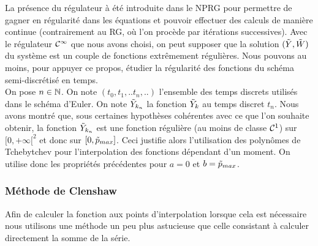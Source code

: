 \documentclass[10.5pt]{article}
\begin{document}
\begin{multicols*}{2}
{
}


La présence du régulateur à été introduite dans le NPRG pour permettre de gagner en régularité dans les équations et pouvoir effectuer des calculs de manière continue (contrairement au RG, où l'on procède par itérations successives). Avec le régulateur $\mathcal{C}^\infty$ que nous avons choisi, on peut supposer que la solution $(\tilde{Y}, \tilde{W})$ du système est un couple de fonctions extrêmement régulières. Nous pouvons au moins, pour appuyer ce propos, étudier la régularité des fonctions du schéma semi-discrétisé en temps. \\
\indent
On pose $n \in \mathbb{N}$. On note $(t_0, t_1, .. t_n, ..)$ l'ensemble des temps discrets utilisés dans le schéma d'Euler. On note $\tilde{Y}_{k_n}$ la fonction $\tilde{Y}_k$ au temps discret $t_n$. Nous avons montré que, sous certaines hypothèses cohérentes avec ce que l'on souhaite obtenir, la fonction $\tilde{Y}_{k_n}$ est une fonction régulière (au moins de classe $\mathcal{C}^1$) sur $[0, +\infty[^2$ et donc sur $[0, \tilde{p}_{max}]$. Ceci justifie alors l'utilisation des polynômes de Tchebytchev pour l'interpolation des fonctions dépendant d'un moment. On utilise donc les propriétés précédentes pour $a=0$ et $b = \tilde{p}_{max}$. 




\subsubsection{Méthode de Clenshaw}


Afin de calculer la fonction aux points d'interpolation lorsque cela est nécessaire nous utilisons une méthode un peu plus astucieuse que celle consistant à calculer directement la somme de la série. \\


\end{multicols*}
\end{document}
